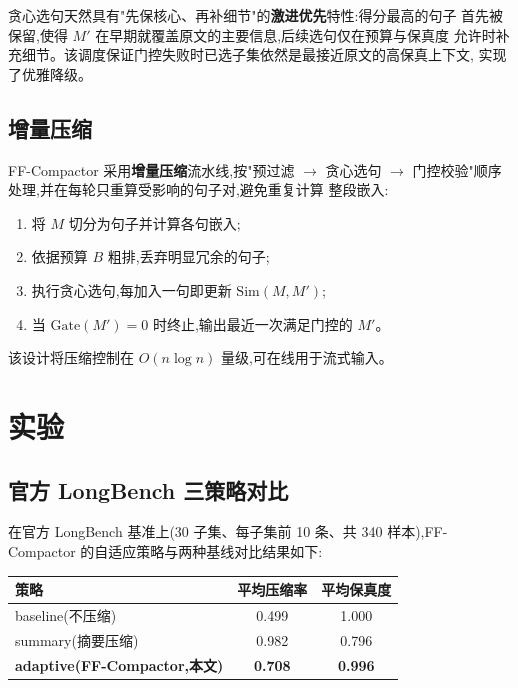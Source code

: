 \documentclass[11pt,a4paper]{article}
\begin{document}
贪心选句天然具有"先保核心、再补细节"的\textbf{激进优先}特性:得分最高的句子
首先被保留,使得 $M'$ 在早期就覆盖原文的主要信息,后续选句仅在预算与保真度
允许时补充细节。该调度保证门控失败时已选子集依然是最接近原文的高保真上下文,
实现了优雅降级。

\subsection{增量压缩}

FF-Compactor 采用\textbf{增量压缩}流水线,按"预过滤 $\rightarrow$ 贪心选句
$\rightarrow$ 门控校验"顺序处理,并在每轮只重算受影响的句子对,避免重复计算
整段嵌入:

\begin{enumerate}
  \item 将 $M$ 切分为句子并计算各句嵌入;
  \item 依据预算 $B$ 粗排,丢弃明显冗余的句子;
  \item 执行贪心选句,每加入一句即更新 $\mathrm{Sim}(M, M')$;
  \item 当 $\mathrm{Gate}(M')=0$ 时终止,输出最近一次满足门控的 $M'$。
\end{enumerate}

该设计将压缩控制在 $O(n \log n)$ 量级,可在线用于流式输入。

\section{实验}

\subsection{官方 LongBench 三策略对比}

在官方 LongBench 基准上(30 子集、每子集前 10 条、共 340 样本),FF-Compactor
的自适应策略与两种基线对比结果如下:

\begin{table}[h]
  \centering
  \begin{tabular}{@{}lcc@{}}
    \toprule
    策略 & 平均压缩率 & 平均保真度 \\
    \midrule
    baseline(不压缩) & 0.499 & 1.000 \\
    summary(摘要压缩) & 0.982 & 0.796 \\
    \textbf{adaptive(FF-Compactor,本文)} & \textbf{0.708} & \textbf{0.996} \\
    \bottomrule
  \end{tabular}
\end{table}
\end{document}

